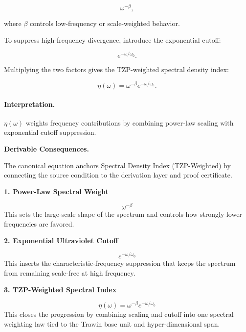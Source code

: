 \begin{equation}
\omega^{-\beta},
\end{equation}

where $\beta$ controls low-frequency or scale-weighted behavior.

To suppress high-frequency divergence, introduce the exponential cutoff:

\begin{equation}
e^{-\omega/\omega_0}.
\end{equation}

Multiplying the two factors gives the TZP-weighted spectral density index:

\begin{equation}
\boxed{
\eta(\omega)
=
\omega^{-\beta}
e^{-\omega/\omega_0}.
}
\end{equation}

\paragraph{Interpretation.}
$\eta(\omega)$ weights frequency contributions by combining power-law scaling with exponential cutoff suppression.

\par\vspace{0.35em}
\noindent\textbf{Derivable Consequences.}\quad
\begingroup
\footnotesize
\raggedright
The canonical equation anchors Spectral Density Index (TZP-Weighted) by connecting the source condition to the derivation layer and proof certificate.
\par\endgroup

\noindent\textbf{1. Power-Law Spectral Weight}\par
\[
\omega^{-\beta}
\]
\noindent This sets the large-scale shape of the spectrum and controls how strongly lower frequencies are favored.\par
\noindent\textbf{2. Exponential Ultraviolet Cutoff}\par
\[
e^{-\omega/\omega_{0}}
\]
\noindent This inserts the characteristic-frequency suppression that keeps the spectrum from remaining scale-free at high frequency.\par
\noindent\textbf{3. TZP-Weighted Spectral Index}\par
\[
\eta(\omega)
=
\omega^{-\beta} e^{-\omega/\omega_{0}}
\]
\noindent This closes the progression by combining scaling and cutoff into one spectral weighting law tied to the Trawin base unit and hyper-dimensional span.\par

